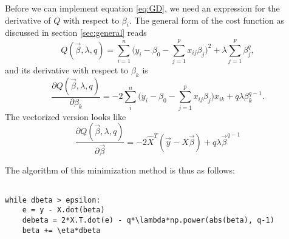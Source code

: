 Before we can implement equation \eqref{eq:GD}, we need an expression for the derivative of $Q$ with respect to $\beta_i$. The general form of the cost function as discussed in section \ref{sec:general} reads
\begin{equation}
Q(\vec{\beta},\lambda,q)=\sum_{i=1}^{n}\Big(y_i-\beta_0-\sum_{j=1}^px_{ij}\beta_j\Big)^2+\lambda\sum_{j=1}^p\beta_j^q,
\label{eq:cost_gen}
\end{equation}
and its derivative with respect to $\beta_k$ is
\begin{equation}
\frac{\partial Q(\vec{\beta},\lambda,q)}{\partial\beta_k}=-2\sum_i^n\Big(y_i-\beta_0-\sum_{j=1}^px_{ij}\beta_j\Big)x_{ik}+q\lambda\beta_k^{q-1}.
\label{eq:der_cost_gen}
\end{equation}
The vectorized version looks like
\begin{equation}
\frac{\partial Q(\vec{\beta},\lambda,q)}{\partial\vec{\beta}}=-2\hat{X}^T(\vec{y}-\hat{X}\vec{\beta})+q\lambda\vec{\beta}^{q-1}
\label{eq:der_cost_gen_vec}
\end{equation}

The algorithm of this minimization method is thus as follows:

\lstset{basicstyle=\scriptsize}
\begin{lstlisting}

while dbeta > epsilon:
	e = y - X.dot(beta)
    debeta = 2*X.T.dot(e) - q*\lambda*np.power(abs(beta), q-1)
    beta += \eta*dbeta


\end{lstlisting}